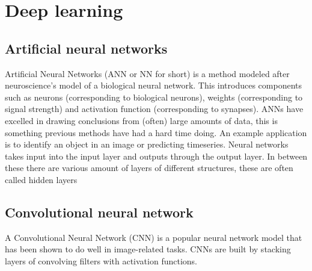 \section{Deep learning}

\subsection{Artificial neural networks}
Artificial Neural Networks (ANN or NN for short) is a method modeled after neuroscience’s model of a biological neural network.
This introduces components such as neurons (corresponding to biological neurons), weights (corresponding to signal strength) and activation function (corresponding to synapses).
ANNs have excelled in drawing conclusions from (often) large amounts of data, this is something previous methods have had a hard time doing.
An example application is to identify an object in an image or predicting timeseries.
Neural networks takes input into the input layer and outputs through the output layer.
In between these there are various amount of layers of different structures, these are often called hidden layers

\lipsum[1]

\subsection{Convolutional neural network}


A Convolutional Neural Network (CNN) is a popular neural network model that has been shown to do well in image-related tasks.
CNNs are built by stacking layers of convolving filters with activation functions.


